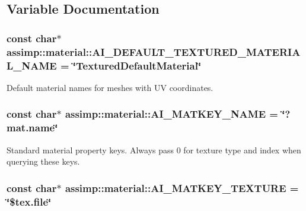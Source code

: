 \subsection{Variable Documentation}
\hypertarget{namespaceassimp_1_1material_a6578b472c6e92eb5b2ecd848a52ffb83}{
\subsubsection[{A\+I\+\_\+\+D\+E\+F\+A\+U\+L\+T\+\_\+\+T\+E\+X\+T\+U\+R\+E\+D\+\_\+\+M\+A\+T\+E\+R\+I\+A\+L\+\_\+\+N\+A\+M\+E}]{\setlength{\rightskip}{0pt plus 5cm}const char$\ast$ assimp\+::material\+::\+A\+I\+\_\+\+D\+E\+F\+A\+U\+L\+T\+\_\+\+T\+E\+X\+T\+U\+R\+E\+D\+\_\+\+M\+A\+T\+E\+R\+I\+A\+L\+\_\+\+N\+A\+M\+E = \char`\"{}Textured\+Default\+Material\char`\"{}}}\label{namespaceassimp_1_1material_a6578b472c6e92eb5b2ecd848a52ffb83}
Default material names for meshes with U\+V coordinates. \hypertarget{namespaceassimp_1_1material_a5548b5b36911f681f986f5c26acee9bd}{
\subsubsection[{A\+I\+\_\+\+M\+A\+T\+K\+E\+Y\+\_\+\+N\+A\+M\+E}]{\setlength{\rightskip}{0pt plus 5cm}const char$\ast$ assimp\+::material\+::\+A\+I\+\_\+\+M\+A\+T\+K\+E\+Y\+\_\+\+N\+A\+M\+E = \char`\"{}?mat.\+name\char`\"{}}}\label{namespaceassimp_1_1material_a5548b5b36911f681f986f5c26acee9bd}
Standard material property keys. Always pass 0 for texture type and index when querying these keys. \hypertarget{namespaceassimp_1_1material_a267de50d6dfe754f700df9e231ea6b60}{
\subsubsection[{A\+I\+\_\+\+M\+A\+T\+K\+E\+Y\+\_\+\+T\+E\+X\+T\+U\+R\+E}]{\setlength{\rightskip}{0pt plus 5cm}const char$\ast$ assimp\+::material\+::\+A\+I\+\_\+\+M\+A\+T\+K\+E\+Y\+\_\+\+T\+E\+X\+T\+U\+R\+E = \char`\"{}\$tex.\+file\char`\"{}}}\label{namespaceassimp_1_1material_a267de50d6dfe754f700df9e231ea6b60}


